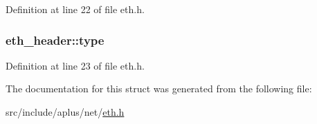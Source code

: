Definition at line 22 of file eth.\+h.

\hypertarget{structeth__header_a1f44bfea959183d53e42185c107fa7c0}{
\subsubsection[{type}]{ eth\+\_\+header\+::type}}\label{structeth__header_a1f44bfea959183d53e42185c107fa7c0}


Definition at line 23 of file eth.\+h.



The documentation for this struct was generated from the following file\+:\begin{DoxyCompactItemize}
\item 
src/include/aplus/net/\hyperlink{eth_8h}{eth.\+h}\end{DoxyCompactItemize}
